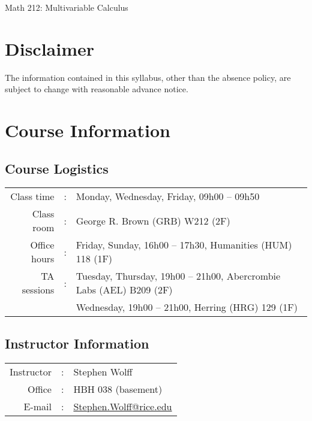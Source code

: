 


\begin{center}
{\Large Math 212: Multivariable Calculus}
\end{center}





\section{Disclaimer}

The information contained in this syllabus, other than the absence policy, are subject to change with reasonable advance notice.



%
%
%
%

\section{Course Information}



\subsection{Course Logistics}

\begin{tabular}{r c l}
Class time 	&	:	&	Monday, Wednesday, Friday, 09h00 -- 09h50	\\
Class room	&	:	&	George R. Brown (GRB) W212 (2F)	\\
Office hours	&	:	&	Friday, Sunday, 16h00 -- 17h30, Humanities (HUM) 118 (1F)	\\
TA sessions	&	:	&	Tuesday, Thursday, 19h00 -- 21h00, Abercrombie Labs (AEL) B209 (2F)	\\
			&		&	Wednesday, 19h00 -- 21h00, Herring (HRG) 129 (1F)
\end{tabular}



\subsection{Instructor Information}


\begin{tabular}{r c l}
Instructor	&	:	&	Stephen Wolff	\\
Office 	&	:	&	HBH 038 (basement)	\\
E-mail	&	:	&	\href{mailto:Stephen.Wolff@rice.edu?subject=[Math\%20212]}{Stephen.Wolff@rice.edu}
\end{tabular}



